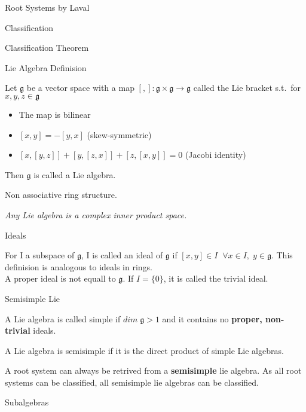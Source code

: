 \documentclass[12pt, letterpaper]{article}
\begin{document}
\begin{section}{Root Systems by Laval}
\begin{subsection}{Classification}
\begin{subsubsection}{Classification Theorem}
    \end{subsubsection}

  \end{subsection}

  \begin{subsection}{Lie Algebra Definision}

    Let \(\mathfrak{g}\) be a vector space with a map \([,]: \mathfrak{g}
    \times \mathfrak{g} \to \mathfrak{g}\) called the Lie bracket s.t.\ for
    \(x, y, z \in \mathfrak{g}\)
    \begin{itemize}
      \item The map is bilinear
      \item \([x, y] = -[y, x]\) (skew-symmetric)
      \item \([x, [y, z]] + [y, [z, x]] + [z, [x, y]] = 0\) (Jacobi identity)
    \end{itemize}
    Then \(\mathfrak{g}\) is called a Lie algebra.

    Non associative ring structure.

    \emph{Any Lie algebra is a complex inner product space.}

    \begin{subsubsection}{Ideals}

      For I a subspace of \(\mathfrak{g}\), I is called an ideal of
      \(\mathfrak{g}\) if \([x, y] \in I \;\; \forall x \in I,\; y\in
      \mathfrak{g}\). This definision is analogous to ideals in rings. \\
      A proper ideal is not equall to \(\mathfrak{g}\). If \(I = \{0\}\), it is
      called the trivial ideal.

    \end{subsubsection}

    \begin{subsubsection}{Semisimple Lie}

      A Lie algebra is called simple if \(dim \; \mathfrak{g} > 1\) and it
      contains no \textbf{proper, non-trivial} ideals.

      A Lie algebra is semisimple if it is the direct product of simple Lie
      algebras.

      A root system can always be retrived from a \textbf{semisimple} lie
      algebra. As all root systems can be classified, all semisimple lie
      algebras can be classified.

    \end{subsubsection}

    \begin{subsubsection}{Subalgebras}


\end{subsubsection}
\end{subsection}
\end{section}
\end{document}
